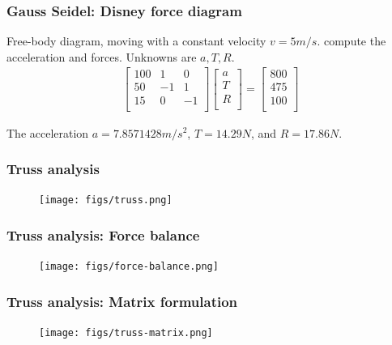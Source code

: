 \documentclass[notes]{beamer}
\begin{document}
\begin{frame}
	\frametitle{Gauss Seidel: Disney force diagram}
	Free-body diagram, moving with a constant velocity $v = 5 m/s$. compute the acceleration and forces. Unknowns are $a, T, R$.
	\begin{align*}
		\begin{bmatrix}
			100 & 1 & 0 \\
			50 & -1 & 1 \\
			15 & 0 & -1 \\
		\end{bmatrix}
		\begin{bmatrix}
			a \\
			T \\
			R \\
		\end{bmatrix} = 
		\begin{bmatrix}
		800 \\
		475 \\
		100 \\
	\end{bmatrix}
	\end{align*}

	The acceleration $a = 7.8571428 m/s^2$, $T= 14.29N$, and $R=17.86 N$.
\end{frame}
\begin{frame}
	\frametitle{Truss analysis}
	\begin{figure}[ht]
		\centering
		\texttt{[image: figs/truss.png]}
	\end{figure}
\end{frame}

\begin{frame}
	\frametitle{Truss analysis: Force balance}
	\begin{figure}[ht]
		\centering
		\texttt{[image: figs/force-balance.png]}
	\end{figure}
\end{frame}

\begin{frame}
	\frametitle{Truss analysis: Matrix formulation}
	\begin{figure}[ht]
		\centering
		\texttt{[image: figs/truss-matrix.png]}
	\end{figure}
\end{frame}
\end{document}
